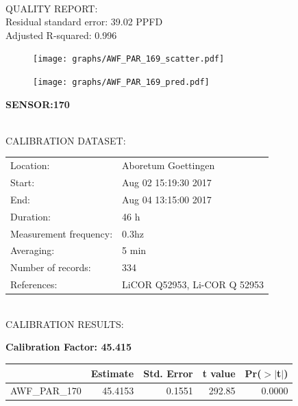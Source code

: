 \documentclass[oneside]{report}
\begin{document}
\hrulefill\\
QUALITY REPORT:\\
Residual standard error: 39.02 PPFD\\
Adjusted R-squared: 0.996



\begin{figure}[H]
  \centering
  \texttt{[image: graphs/AWF\_PAR\_169\_scatter.pdf]}
\end{figure}




\begin{figure}[H]
  \centering
  \texttt{[image: graphs/AWF\_PAR\_169\_pred.pdf]}
\end{figure}

\pagebreak


\begin{center}
\large{\textbf{SENSOR:170}}\\
\end{center}

\hrulefill\\
CALIBRATION DATASET:\\
\begin{table}[h!]
  \centering
  \label{tab:table1}
  \begin{tabular}{ll}
    Location: & Aboretum Goettingen\\ 
    
    
    Start:  & Aug 02 15:19:30 2017 \\
    End:   & Aug 04 13:15:00 2017\\ 
    Duration: & 46 h\\
    Measurement frequency: & 0.3hz\\
    Averaging:  &5 min\\
    Number of records: & 334 \\
    References: & LiCOR Q52953, Li-COR Q 52953 \\
  \end{tabular}
\end{table}

\hrulefill\\
CALIBRATION RESULTS:\\


\begin{center}
\textbf{\large{Calibration Factor: 45.415}}\\
\end{center}
\begin{table}[ht]
\centering
\begin{tabular}{rrrrr}
  \hline
 & Estimate & Std. Error & t value & Pr($>$$|$t$|$) \\ 
  \hline
AWF\_PAR\_170 & 45.4153 & 0.1551 & 292.85 & 0.0000 \\ 
   \hline
\end{tabular}
\end{table}
\end{document}
